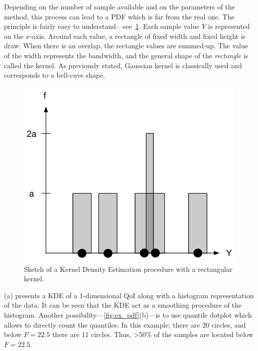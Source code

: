 Depending on the number of sample available and on the parameters of the method, this process can lead to a PDF which is far from the real one. The principle is fairly easy to understand---see~\cref{fig:kde}. Each sample value $Y$ is represented on the $x$-axis. Around each value, a rectangle of fixed width and fixed height is draw. When there is an overlap, the rectangle values are summed-up. The value of the width represents the bandwidth, and the general shape of the \emph{rectangle} is called the kernel. As previously stated, Gaussian kernel is classically used and corresponds to a bell-cuve shape.

\begin{figure}[H]
\centering
\includegraphics[width=0.6\linewidth,keepaspectratio]{fig/literature/kde.pdf}
\caption{Sketch of a Kernel Density Estimation procedure with a rectangular kernel.}
\label{fig:kde}
\end{figure}

(a) presents a KDE of a 1-dimensional QoI along with a histogram representation of the data. It can be seen that the KDE act as a smoothing procedure of the histogram. Another possibility---\cref{fig:ex_pdf}(b)---is to use quantile dotplot \cite{kay2016} which allows to directly count the quantiles. In this example, there are 20 circles, and below $F=22.5$ there are 11 circles. Thus, >50\% of the samples are located below $F=22.5$.

